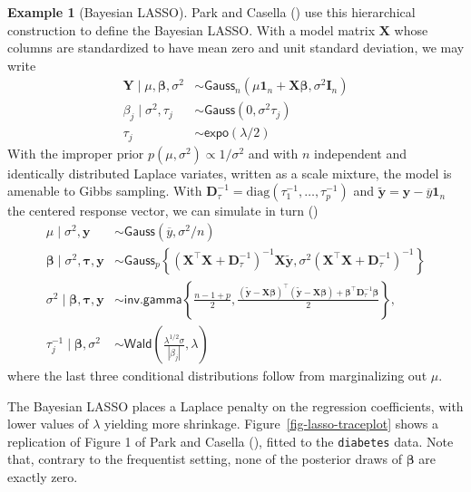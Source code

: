 \documentclass[
  11pt,
  letterpaper,
]{scrbook}
\newcounter{none} %
\theoremstyle{definition}
\newtheorem{example}{Example}[chapter]
\theoremstyle{plain}
\theoremstyle{plain}
\theoremstyle{plain}
\theoremstyle{definition}
\theoremstyle{definition}
\theoremstyle{plain}
\theoremstyle{plain}
\theoremstyle{remark}
\begin{document}
\begin{example}[Bayesian
LASSO]
Park and Casella () use this
hierarchical construction to define the Bayesian LASSO. With a model
matrix \(\mathbf{X}\) whose columns are standardized to have mean zero
and unit standard deviation, we may write \begin{align*}
\boldsymbol{Y} \mid \mu, \boldsymbol{\beta}, \sigma^2 &\sim  \mathsf{Gauss}_n(\mu \boldsymbol{1}_n + \mathbf{X}\boldsymbol{\beta}, \sigma^2 \mathbf{I}_n)\\
\beta_j \mid \sigma^2, \tau_j &\sim \mathsf{Gauss}(0, \sigma^2\tau_j)\\
\tau_j &\sim \mathsf{expo}(\lambda/2)
\end{align*} With the improper prior
\(p(\mu, \sigma^2) \propto 1/\sigma^2\) and with \(n\) independent and
identically distributed Laplace variates, written as a scale mixture,
the model is amenable to Gibbs sampling. With
\(\mathbf{D}^{-1}_{\tau} = \mathrm{diag}(\tau_1^{-1}, \ldots, \tau_p^{-1})\)
and
\(\tilde{\boldsymbol{y}} = \boldsymbol{y} - \overline{y}\mathbf{1}_n\)
the centered response vector, we can simulate in turn
() \begin{align*}
\mu \mid \sigma^2, \boldsymbol{y} &\sim \mathsf{Gauss}(\overline{y}, \sigma^2/n) \\
\boldsymbol{\beta} \mid \sigma^2, \boldsymbol{\tau}, \boldsymbol{y} &\sim \mathsf{Gauss}_p\left\{\left(\mathbf{X}^\top\mathbf{X} + \mathbf{D}^{-1}_{\tau}\right)^{-1} \mathbf{X}\widetilde{\boldsymbol{y}}, \sigma^2\left(\mathbf{X}^\top\mathbf{X} + \mathbf{D}^{-1}_{\tau}\right)^{-1}\right\}\\
\sigma^2 \mid \boldsymbol{\beta}, \boldsymbol{\tau},\boldsymbol{y} &\sim \mathsf{inv. gamma}\left\{ \frac{n-1+p}{2}, \frac{(\widetilde{\boldsymbol{y}}-\mathbf{X}\boldsymbol{\beta})^\top(\widetilde{\boldsymbol{y}}-\mathbf{X}\boldsymbol{\beta}) + \boldsymbol{\beta}^\top\mathbf{D}^{-1}_{\tau} \boldsymbol{\beta}}{2}\right\},\\
\tau_j^{-1} \mid \boldsymbol{\beta}, \sigma^2 &\sim \mathsf{Wald} \left( \frac{\lambda^{1/2}\sigma}{|\beta_j|}, \lambda\right)
\end{align*} where the last three conditional distributions follow from
marginalizing out \(\mu.\)

The Bayesian LASSO places a Laplace penalty on the regression
coefficients, with lower values of \(\lambda\) yielding more shrinkage.
Figure~\ref{fig-lasso-traceplot} shows a replication of Figure 1 of Park
and Casella (), fitted to the
\texttt{diabetes} data. Note that, contrary to the frequentist setting,
none of the posterior draws of \(\boldsymbol{\beta}\) are exactly zero.


\end{example}
\end{document}
